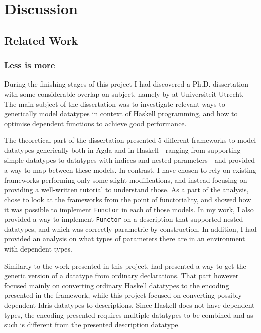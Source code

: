 \documentclass{ituthesis}
\newcommand{\tttype}[1]{\textcolor{type-color}{\texttt{#1}}}
\theoremstyle{break}
\begin{document}
\chapter{Discussion}
\label{cha:Discussion}

\section{Related Work}
\label{sec:Related Work}
\subsection{Less is more}
\label{sub:Less is more}
During the finishing stages of this project I had discovered a Ph.D. dissertation with some considerable overlap on subject, namely  by \cite{magalhaes2012less} at Universiteit Utrecht.
The main subject of the dissertation was to investigate relevant ways to generically model datatypes in context of Haskell programming, and how to optimise dependent functions to achieve good performance.

The theoretical part of the dissertation presented 5 different frameworks to model datatypes generically both in Agda and in Haskell---ranging from supporting simple datatypes to datatypes with indices and nested parameters---and provided a way to map between these models.
In contrast, I have chosen to rely on existing frameworks performing only some slight modifications, and instead focusing on providing a well-written tutorial to understand those.
As a part of the analysis, \citeauthor{magalhaes2012less} chose to look at the frameworks from the point of functoriality, and showed how it was possible to implement \tttype{Functor} in each of those models.
In my work, I also provided a way to implement \tttype{Functor} on a description that supported nested datatypes, and which was correctly parametric by construction.
In addition, I had provided an analysis on what types of parameters there are in an environment with dependent types.

Similarly to the work presented in this project, \citeauthor{magalhaes2012less} had presented a way to get the generic version of a datatype from ordinary declarations.
That part however focused mainly on converting ordinary Haskell datatypes to the encoding presented in the framework, while this project focused on converting possibly dependent Idris datatypes to descriptions.
Since Haskell does not have dependent types, the encoding presented requires multiple datatypes to be combined and as such is different from the presented description datatype.
\end{document}
